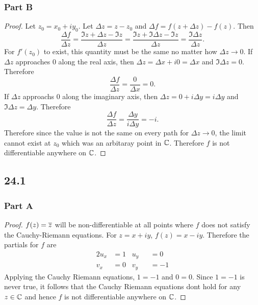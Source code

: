 \documentclass[12pt,titlepage]{extarticle}
\begin{document}
\subsubsection*{Part B}
\begin{proof}
    Let $z_0 = x_0 + i y_0$. Let $\Delta z = z - z_0$ and $\Delta f = f(z + \Delta z) - f(z)$. Then
    \[
        \frac{\Delta f}{\Delta z} = \frac{\Im{z + \Delta z} - \Im{z}}{\Delta z} = \frac{\Im{z} + \Im{\Delta z} - \Im{z}}{\Delta z} = \frac{\Im{\Delta z}}{\Delta z}
    .\]
    For $f'(z_0)$ to exist, this quantity must be the same no matter how $\Delta z \to 0$. If $\Delta z$ approaches $0$ along the real axis, then $\Delta z = \Delta x + i 0 = \Delta x$ and $\Im{\Delta z} = 0$. Therefore
    \[
        \frac{\Delta f}{\Delta z} = \frac{0}{\Delta x} = 0
    .\]
    If $\Delta z$ approachs $0$ along the imaginary axis, then $\Delta z = 0 + i \Delta y = i \Delta y$ and $\Im{\Delta z} = \Delta y$. Therefore
    \[
        \frac{\Delta f}{\Delta z} = \frac{\Delta y}{i\Delta y} = -i
    .\]
    Therefore since the value is not the same on every path for $\Delta z \to 0$, the limit cannot exist at $z_0$ which was an arbitaray point in $\mathbb{C}$. Therefore $f$ is not differentiable anywhere on $\mathbb{C}$.
\end{proof}

\subsection*{24.1}
\subsubsection*{Part A}
\begin{proof}
    $f(z) = \overline{z}$ will be non-differentiable at all points where $f$ does not satisfy the Cauchy-Riemann equations. For $z = x+iy$, $f(z) = x - iy$. Therefore the partials for $f$ are
    \begin{alignat*}{2}
        u_x &= 1 \;\;\; u_y &&= 0 \\
        v_x &= 0 \;\;\; v_y &&= -1
    \end{alignat*}
    Applying the Cauchy Riemann equations, $1 = -1$ and $0 = 0$. Since $1 = -1$ is never true, it follows that the Cauchy Riemann equations dont hold for any $z \in \mathbb{C}$ and hence $f$ is not differentiable anywhere on $\mathbb{C}$.
\end{proof}
\end{document}
